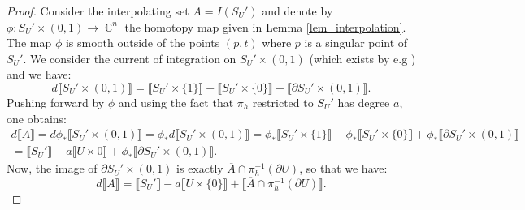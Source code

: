 \documentclass[12pt]{amsbook}%
\theoremstyle{definition}
\theoremstyle{remark}
\numberwithin{section}{chapter}
\numberwithin{subsection}{section}
\numberwithin{figure}{chapter}
\DeclareMathOperator{\C}{\mathbb{C}}
\newcommand\intcur[1]{\llbracket #1 \rrbracket}
\def\fS{{\mathfrak{S}}}
\def\mini{\scriptsize}
\def\kap{}
\begin{document}
{{\begin{proof} %

Consider the interpolating set $A=I({S_U'})$ and denote by $\phi : S_U' \times (0,1) \to \C^n$ the homotopy map given in Lemma \ref{lem_interpolation}. 
The map $\phi$ is smooth outside of the points $(p,t)$ where $p$ is a singular point of $S_U'$. 
We consider the current of integration on $S_U' \times (0,1)$ (which exists by e.g \cite{hartd_cie}) and we have: 
\begin{equation}
d \intcur{S_U' \times (0,1)} = \intcur{S_U' \times \{1 \}} -  \intcur{S_U' \times \{0 \}} + \intcur{\partial S_U' \times (0,1)}. 
\end{equation}  
Pushing forward by $\phi$ and using the fact that $\pi_h$ restricted to $S_U' $ has degree $a$, one obtains:
\begin{multline*}
d \intcur{A} = d \phi_* \intcur{S_U'\times (0,1)} = \phi_* d \intcur{S_U' \times (0,1)} = \phi_* \intcur{S_U' \times \{1 \}} - \phi_* \intcur{S_U' \times \{0 \}} + \phi_*\intcur{\partial S_U' \times (0,1)} \\= \intcur{S_U'} - a \intcur{U\times 0}  + \phi_* \intcur{\partial S_U' \times (0,1)}.  
\end{multline*}
Now, the image of $\partial S_U' \times (0,1)$ is exactly $\overline{A} \cap \pi_h^{-1} (\partial U) $, so that we have:
\begin{equation*}
d \intcur{A} = \intcur{S_U'} - a \intcur{U\times \{ 0 \}} + \intcur{\overline{A} \cap \pi_h^{-1}(\partial U) }. 
\end{equation*}


\end{proof}}}
\end{document}
